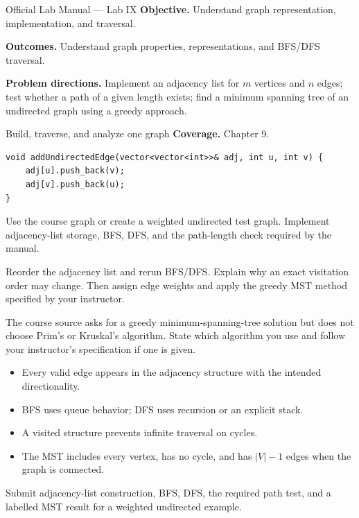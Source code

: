 
\begin{sourcealignment}{Official Lab Manual --- Lab IX}
\textbf{Objective.} Understand graph representation, implementation, and traversal.

\textbf{Outcomes.} Understand graph properties, representations, and BFS/DFS traversal.

\textbf{Problem directions.} Implement an adjacency list for $m$ vertices and $n$ edges; test whether a path of a given length exists; find a minimum spanning tree of an undirected graph using a greedy approach.
\end{sourcealignment}

\begin{labproject}{Build, traverse, and analyze one graph}
\textbf{Coverage.} Chapter 9.

\begin{lstlisting}
void addUndirectedEdge(vector<vector<int>>& adj, int u, int v) {
    adj[u].push_back(v);
    adj[v].push_back(u);
}
\end{lstlisting}

Use the course graph or create a weighted undirected test graph. Implement adjacency-list storage, BFS, DFS, and the path-length check required by the manual.

\begin{tryit}
Reorder the adjacency list and rerun BFS/DFS. Explain why an exact visitation order may change. Then assign edge weights and apply the greedy MST method specified by your instructor.
\end{tryit}

\begin{clarification}
The course source asks for a greedy minimum-spanning-tree solution but does not choose Prim's or Kruskal's algorithm. State which algorithm you use and follow your instructor's specification if one is given.
\end{clarification}
\end{labproject}

\begin{verification}
\begin{itemize}
  \item Every valid edge appears in the adjacency structure with the intended directionality.
  \item BFS uses queue behavior; DFS uses recursion or an explicit stack.
  \item A visited structure prevents infinite traversal on cycles.
  \item The MST includes every vertex, has no cycle, and has $|V|-1$ edges when the graph is connected.
\end{itemize}
\end{verification}

\begin{labdeliverable}
Submit adjacency-list construction, BFS, DFS, the required path test, and a labelled MST result for a weighted undirected example.
\end{labdeliverable}
